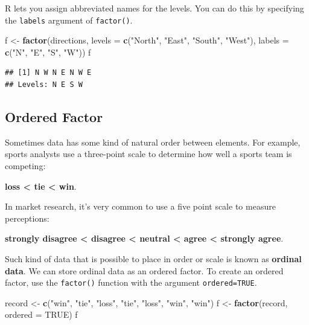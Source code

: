 \documentclass[
]{book}
\newenvironment{Shaded}{\begin{snugshade}}{\end{snugshade}}
\newcommand{\DataTypeTok}[1]{\textcolor[rgb]{0.13,0.29,0.53}{#1}}
\newcommand{\KeywordTok}[1]{\textcolor[rgb]{0.13,0.29,0.53}{\textbf{#1}}}
\newcommand{\NormalTok}[1]{#1}
\newcommand{\OtherTok}[1]{\textcolor[rgb]{0.56,0.35,0.01}{#1}}
\newcommand{\StringTok}[1]{\textcolor[rgb]{0.31,0.60,0.02}{#1}}
\begin{document}
R lets you assign abbreviated names for the levels. You can do this by specifying the \texttt{labels} argument of \texttt{factor()}.

\begin{Shaded}
\begin{Highlighting}[]
\NormalTok{f <-}\StringTok{ }\KeywordTok{factor}\NormalTok{(directions,}
    \DataTypeTok{levels =} \KeywordTok{c}\NormalTok{(}\StringTok{"North"}\NormalTok{,}
        \StringTok{"East"}\NormalTok{, }\StringTok{"South"}\NormalTok{,}
        \StringTok{"West"}\NormalTok{), }\DataTypeTok{labels =} \KeywordTok{c}\NormalTok{(}\StringTok{"N"}\NormalTok{,}
        \StringTok{"E"}\NormalTok{, }\StringTok{"S"}\NormalTok{, }\StringTok{"W"}\NormalTok{))}
\NormalTok{f}
\end{Highlighting}
\end{Shaded}

\begin{verbatim}
## [1] N W N E N W E
## Levels: N E S W
\end{verbatim}

\hypertarget{ordered-factor}{%
\subsection{Ordered Factor}\label{ordered-factor}}

Sometimes data has some kind of natural order between elements. For example, sports analysts use a three-point scale to determine how well a sports team is competing:

\textbf{loss \textless{} tie \textless{} win}.

In market research, it's very common to use a five point scale to measure perceptions:

\textbf{strongly disagree \textless{} disagree \textless{} neutral \textless{} agree \textless{} strongly agree}.

Such kind of data that is possible to place in order or scale is known as \textbf{ordinal data}. We can store ordinal data as an ordered factor. To create an ordered factor, use the \texttt{factor()} function with the argument \texttt{ordered=TRUE}.

\begin{Shaded}
\begin{Highlighting}[]
\NormalTok{record <-}\StringTok{ }\KeywordTok{c}\NormalTok{(}\StringTok{"win"}\NormalTok{, }\StringTok{"tie"}\NormalTok{,}
    \StringTok{"loss"}\NormalTok{, }\StringTok{"tie"}\NormalTok{, }\StringTok{"loss"}\NormalTok{,}
    \StringTok{"win"}\NormalTok{, }\StringTok{"win"}\NormalTok{)}
\NormalTok{f <-}\StringTok{ }\KeywordTok{factor}\NormalTok{(record, }\DataTypeTok{ordered =} \OtherTok{TRUE}\NormalTok{)}
\NormalTok{f}
\end{Highlighting}
\end{Shaded}
\end{document}
